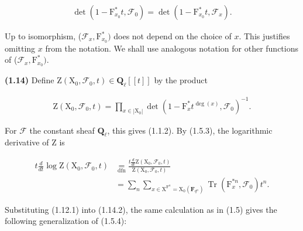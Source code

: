 \documentclass[10pt,leqno]{article}
\begin{document}
\begin{equation*}\begin{gathered}\operatorname{det}(1- \mathrm{F}_{x_{0}}^{*}t,\mathcal{F} _{0}) = \operatorname{det}(1- \mathrm{F}_{x_{0}}^{*}t,\mathcal{F} _{x}).\end{gathered}\end{equation*}

\noindent Up to isomorphism, (\(\mathcal{F} _{x},\mathrm{F}_{x_{0}}^{*})\) does not depend on the choice of \(x\). This justifies omitting \(x\) from the notation. We shall use analogous notation for other functions of (\(\mathcal{F} _{x},\mathrm{F}_{x_{0}}^{*})\).\par

\clearpage

\label{physical-8}\par\smallskip

\noindent \textbf{(1.14)} Define \(\mathrm{Z}(\mathrm{X}_{0},\mathcal{F} _{0},t)\in \mathbf{Q}_{\ell }[[t]]\) by the product\par

\begin{equation*}\begin{gathered}\mathrm{Z}(\mathrm{X}_{0},\mathcal{F} _{0},t) = \prod _{x\in |\mathrm{X}_{0}|} \operatorname{det}(1- \mathrm{F}_{x}^{*}t^{\operatorname{deg}(x)},\mathcal{F} _{0})^{- 1}.\end{gathered}\tag{1.14.1}\end{equation*}

\noindent For \(\mathcal{F} \) the constant sheaf \(\mathbf{Q}_{\ell }\), this gives (1.1.2). By (1.5.3), the logarithmic derivative of \(\mathrm{Z}\) is\par

\begin{equation*}\begin{aligned}
t\frac{d}{dt}\log\mathrm Z(\mathrm X_0,\mathcal F_0,t)
&\underset{\mathrm{dfn}}{=}\frac{t\frac{d}{dt}\mathrm Z(\mathrm X_0,\mathcal F_0,t)}{\mathrm Z(\mathrm X_0,\mathcal F_0,t)}\\
&=\sum_n\sum_{x\in\mathrm X^{\mathrm F^n}=\mathrm X_0(\mathbf F_{q^n})}\operatorname{Tr}(\mathrm F_x^{*n},\mathcal F_0)t^n.
\end{aligned}\tag{1.14.2}\end{equation*}

\noindent Substituting (1.12.1) into (1.14.2), the same calculation as in (1.5) gives the following generalization of (1.5.4):\par
\end{document}
